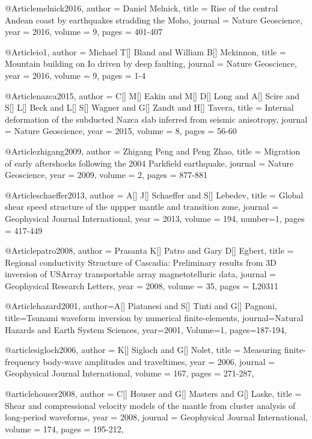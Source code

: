 @Article{melnick2016,
  author = 	 {Daniel Melnick},
  title = 	 {Rise of the central Andean coast by earthquakes stradding the Moho},
  journal = 	 {Nature Geoscience},
  year = 	 2016,
  volume = 9,
  pages =	 {401-407}
}

@Article{io1,
  author = 	 {Michael T[] Bland and William B[] Mckinnon},
  title = 	 {Mountain building on {I}o driven by deep faulting},
  journal = 	 {Nature Geoscience},
  year = 	 2016,
  volume = 9,
  pages =	 {1-4}
}


@Article{nazca2015,
  author = 	 {C[] M[] Eakin and M[] D[] Long and A[] Scire and S[] L[] Beck and L[] S[] Wagner and G[] Zandt and H[] Tavera},
  title = 	 {Internal deformation of the subducted Nazca slab inferred from seismic anisotropy},
  journal = 	 {Nature Geoscience},
  year = 	 2015,
  volume = 8,
  pages =	 {56-60}
}

@Article{zhigang2009,
  author = 	 {Zhigang Peng and Peng Zhao},
  title = 	 {Migration of early aftershocks following the 2004 Parkfield earthquake},
  journal = 	 {Nature Geoscience},
  year = 	 2009,
  volume = 2,
  pages =	 {877-881}
}

@Article{schaeffer2013,
  author = 	 {A[] J[] Schaeffer and S[] Lebedev},
  title = 	 {Global shear speed structure of the uppper mantle and transition zone},
  journal = 	 {Geophysical Journal International},
  year = 	 2013,
  volume = 194,
  number=1,
  pages =	 {417-449}
}

@Article{patro2008,
  author = 	 {Prasanta K[] Patro and Gary D[] Egbert},
  title = 	 {Regional conductivity Structure of Cascadia: Preliminary results from 3D inversion of USArray transportable array magnetotelluric data},
  journal = 	 {Geophysical Research Letters},
  year = 	 2008,
  volume = 35,
  pages =	 {L20311}
}

@Article{hazard2001,
  author={A[] Piatanesi and S[] Tinti and G[] Pagnoni},
  title={Tsunami waveform inversion by numerical finite-elements},
  journal={Natural Hazards and Earth System Sciences},
  year=2001,
  Volume=1,
  pages={187-194},
}

@article{sigloch2006,
author = {K[] Sigloch and G[] Nolet},
title = {Measuring finite-frequency body-wave amplitudes and traveltimes},
year = {2006},
journal = {Geophysical Journal International},
volume = {167},
pages = {271-287},
}

@article{houser2008,
author = {C[] Houser and G[] Masters and G[] Laske},
title = {Shear and compressional velocity models of the mantle from cluster analysis of long-period waveforms},
year = {2008},
journal = {Geophysical Journal International},
volume = {174},
pages = {195-212},
}


